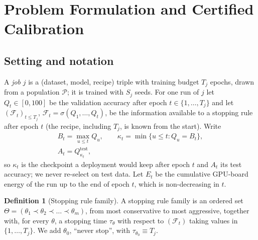 \documentclass[3p,twocolumn,10pt]{elsarticle}
\theoremstyle{definition}
\newtheorem{definition}{Definition}
\begin{document}
\section{Problem Formulation and Certified Calibration}
\label{sec:problem}

\subsection{Setting and notation}
A \emph{job} $j$ is a (dataset, model, recipe) triple with training budget $T_j$ epochs, drawn from a population $\mathcal{P}$; it is trained with $S_j$ seeds. For one run of $j$ let $Q_t\in[0,100]$ be the validation accuracy after epoch $t\in\{1,\dots,T_j\}$ and let $(\mathcal{F}_t)_{t\le T_j}$, $\mathcal{F}_t=\sigma(Q_1,\dots,Q_t)$, be the information available to a stopping rule after epoch $t$ (the recipe, including $T_j$, is known from the start). Write
\begin{equation}
\begin{gathered}
B_t=\max_{u\le t}Q_u,\qquad \kappa_t=\min\{u\le t: Q_u=B_t\},\\
A_t=Q^{\mathrm{test}}_{\kappa_t},
\end{gathered}
\label{eq:audit}
\end{equation}
so $\kappa_t$ is the checkpoint a deployment would keep after epoch $t$ and $A_t$ its test accuracy; we never re-select on test data. Let $E_t$ be the cumulative GPU-board energy of the run up to the end of epoch $t$, which is non-decreasing in $t$.

\begin{definition}[Stopping rule family]
\label{def:family}
A stopping rule family is an ordered set $\Theta=(\theta_1\prec\theta_2\prec\dots\prec\theta_m)$, from most conservative to most aggressive, together with, for every $\theta$, a stopping time $\tau_\theta$ with respect to $(\mathcal{F}_t)$ taking values in $\{1,\dots,T_j\}$. We add $\theta_0$, ``never stop'', with $\tau_{\theta_0}\equiv T_j$.
\end{definition}
\end{document}
